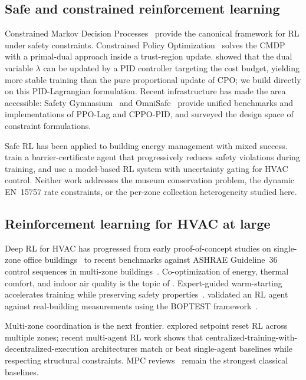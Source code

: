 \subsection{Safe and constrained reinforcement learning}

Constrained Markov Decision Processes~\citep{altman1999constrained}
provide the canonical framework for RL under safety constraints.
Constrained Policy Optimization~\citep{achiam2017cpo} solves the CMDP
with a primal-dual approach inside a trust-region update.
\citet{stooke2020responsive} showed that the dual variable $\lambda$ can
be updated by a PID controller targeting the cost budget, yielding more
stable training than the pure proportional update of CPO; we build
directly on this PID-Lagrangian formulation. Recent infrastructure has
made the area accessible: Safety Gymnasium~\citep{ji2023safety} and
OmniSafe~\citep{ji2023omnisafe} provide unified benchmarks and
implementations of PPO-Lag and CPPO-PID, and
\citet{constraint_formulations_2024} surveyed the design space of
constraint formulations.

Safe RL has been applied to building energy management with mixed
success. \citet{safe_rl_buildings_mdpi_2025} train a barrier-certificate
agent that progressively reduces safety violations during training, and
\citet{safe_mbrl_hvac_2024} use a model-based RL system with uncertainty
gating for HVAC control. Neither work addresses the museum conservation
problem, the dynamic EN~15757 rate constraints, or the per-zone
collection heterogeneity studied here.

\subsection{Reinforcement learning for HVAC at large}

Deep RL for HVAC has progressed from early proof-of-concept studies on
single-zone office buildings~\citep{wang2017drlhvac,brandi2022online} to
recent benchmarks against ASHRAE Guideline~36 control sequences in
multi-zone buildings~\citep{drl_g36_2025}. Co-optimization of energy,
thermal comfort, and indoor air quality is the topic of
\citet{drl_co_optimize_2024}. Expert-guided warm-starting accelerates
training while preserving safety properties~\citep{efficient_assured_2025}.
\citet{boptest_rl_2025} validated an RL agent against real-building
measurements using the BOPTEST framework~\citep{boptest_mpc_2023}.

Multi-zone coordination is the next frontier.
\citet{drl_setpoint_multizone_2022} explored setpoint reset RL across
multiple zones; recent multi-agent RL work
\citep{marl_zone_alloc_2025,marl_electrochromic_2025,marl_demand_response_2025}
shows that centralized-training-with-decentralized-execution
architectures match or beat single-agent baselines while respecting
structural constraints. MPC reviews~\citep{drgona2020mpc_review} remain
the strongest classical baselines.


